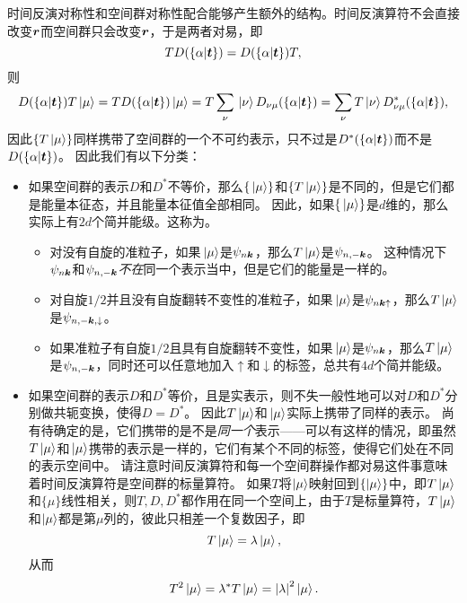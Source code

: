 时间反演对称性和空间群对称性配合能够产生额外的结构。时间反演算符不会直接改变$\vb*{r}$而空间群只会改变$\vb*{r}$，于是两者对易，即
\[
    T D(\{ \alpha | \vb*{t} \}) = D(\{ \alpha | \vb*{t}\}) T,
\]
则
\[
    D(\{ \alpha | \vb*{t}\}) T \ket*{\mu} = T D(\{ \alpha | \vb*{t} \}) \ket*{\mu} = T \sum_\nu \ket*{\nu} D_{\nu \mu}(\{ \alpha | \vb*{t} \}) = \sum_\nu T \ket*{\nu} D^*_{\nu \mu}(\{ \alpha | \vb*{t} \}) ,
\]
因此$\{T \ket*{\mu}\}$同样携带了空间群的一个不可约表示，只不过是$D^*(\{ \alpha | \vb*{t} \})$而不是$D(\{ \alpha | \vb*{t} \})$。
因此我们有以下分类： %
\begin{itemize}
    \item 如果空间群的表示$D$和$D^*$不等价，那么$\{\ket*{\mu}\}$和$\{T \ket*{\mu}\}$是不同的，但是它们都是能量本征态，并且能量本征值全部相同。
    因此，如果$\{\ket*{\mu}\}$是$d$维的，那么实际上有$2d$个简并能级。这称为。
    \begin{itemize}
        \item 对没有自旋的准粒子，如果$\ket*{\mu}$是$\psi_{n \vb*{k}}$，那么$T \ket*{\mu}$是$\psi_{n, -\vb*{k}}$。
        这种情况下$\psi_{n \vb*{k}}$和$\psi_{n, - \vb*{k}}$\emph{不在}同一个表示当中，但是它们的能量是一样的。
        \item 对自旋$1/2$并且没有自旋翻转不变性的准粒子，如果$\ket*{\mu}$是$\psi_{n \vb*{k} \uparrow}$，那么$T \ket*{\mu}$是$\psi_{n, -\vb*{k}, \downarrow}$。
        \item 如果准粒子有自旋$1/2$且具有自旋翻转不变性，如果$\ket*{\mu}$是$\psi_{n \vb*{k}}$，那么$T \ket*{\mu}$是$\psi_{n, -\vb*{k}}$，同时还可以任意地加入$\uparrow$和$\downarrow$的标签，总共有$4d$个简并能级。
    \end{itemize}
    \item 如果空间群的表示$D$和$D^*$等价，且是实表示，则不失一般性地可以对$D$和$D^*$分别做共轭变换，使得$D = D^*$。
    因此$T \ket*{\mu}$和$\ket*{\mu}$实际上携带了同样的表示。
    尚有待确定的是，它们携带的是不是\emph{同一个}表示——可以有这样的情况，即虽然$T \ket*{\mu}$和$\ket*{\mu}$携带的表示是一样的，它们有某个不同的标签，使得它们处在不同的表示空间中。
    请注意时间反演算符和每一个空间群操作都对易这件事意味着时间反演算符是空间群的标量算符。
    如果$T$将$\ket{\mu}$映射回到$\{\ket{\mu}\}$中，即$T \ket{\mu}$和$\{\mu\}$线性相关，则$T, D, D^*$都作用在同一个空间上，由于$T$是标量算符，$T \ket{\mu}$和$\ket{\mu}$都是第$\mu$列的，彼此只相差一个复数因子，即
    \[
        T \ket{\mu} = \lambda \ket{\mu},
    \]
    从而
    \[
        T^2 \ket{\mu} = \lambda^* T \ket{\mu} = \abs{\lambda}^2 \ket{\mu}.
    \]
    \begin{itemize}

\end{itemize}
\end{itemize}
